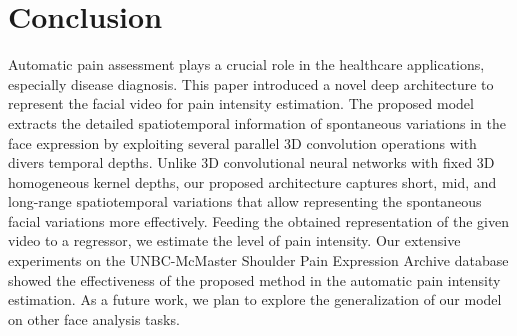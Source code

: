 \documentclass[a4paper,conference]{IEEEtran}
\begin{document}
\section{Conclusion}
Automatic pain assessment plays a crucial role in the healthcare applications, especially disease diagnosis. This paper introduced a novel deep architecture to represent the facial video for pain intensity estimation. The proposed model extracts the detailed spatiotemporal information of spontaneous variations in the face expression by exploiting several parallel 3D convolution operations with divers temporal depths. Unlike 3D convolutional neural networks with fixed 3D homogeneous kernel depths, our proposed architecture captures short, mid, and long-range spatiotemporal variations that allow representing the spontaneous facial variations more effectively. Feeding the obtained representation of the given video to a regressor, we estimate the level of pain intensity. Our extensive experiments on the UNBC-McMaster Shoulder Pain Expression Archive database showed the effectiveness of the proposed method in the automatic pain intensity estimation. As a future work, we plan to explore the generalization of our model on other face analysis tasks.




\end{document}

